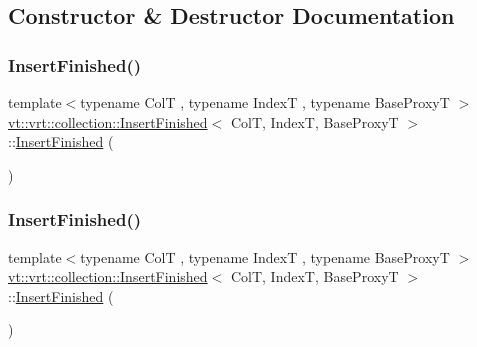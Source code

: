 \subsection{Constructor \& Destructor Documentation}
\mbox{\label{structvt_1_1vrt_1_1collection_1_1_insert_finished_adfe86c7dc499bf7a395f42f30e3c1147}} 
\subsubsection{\texorpdfstring{Insert\+Finished()}{InsertFinished()}\hspace{0.1cm}{\footnotesize\ttfamily [1/4]}}
{\footnotesize\ttfamily template$<$typename ColT , typename IndexT , typename Base\+ProxyT $>$ \\
\hyperlink{structvt_1_1vrt_1_1collection_1_1_insert_finished}{vt\+::vrt\+::collection\+::\+Insert\+Finished}$<$ ColT, IndexT, Base\+ProxyT $>$\+::\hyperlink{structvt_1_1vrt_1_1collection_1_1_insert_finished}{Insert\+Finished} (\begin{DoxyParamCaption}{ }\end{DoxyParamCaption})\hspace{0.3cm}{\ttfamily [default]}}

\mbox{\label{structvt_1_1vrt_1_1collection_1_1_insert_finished_afb46259f654419128600dea6fe4dd5ed}} 
\subsubsection{\texorpdfstring{Insert\+Finished()}{InsertFinished()}\hspace{0.1cm}{\footnotesize\ttfamily [2/4]}}
{\footnotesize\ttfamily template$<$typename ColT , typename IndexT , typename Base\+ProxyT $>$ \\
\hyperlink{structvt_1_1vrt_1_1collection_1_1_insert_finished}{vt\+::vrt\+::collection\+::\+Insert\+Finished}$<$ ColT, IndexT, Base\+ProxyT $>$\+::\hyperlink{structvt_1_1vrt_1_1collection_1_1_insert_finished}{Insert\+Finished} (\begin{DoxyParamCaption}\item[{\hyperlink{structvt_1_1vrt_1_1collection_1_1_insert_finished}{Insert\+Finished}$<$ ColT, IndexT, Base\+ProxyT $>$ const \&}]{ }\end{DoxyParamCaption})\hspace{0.3cm}{\ttfamily [default]}}

